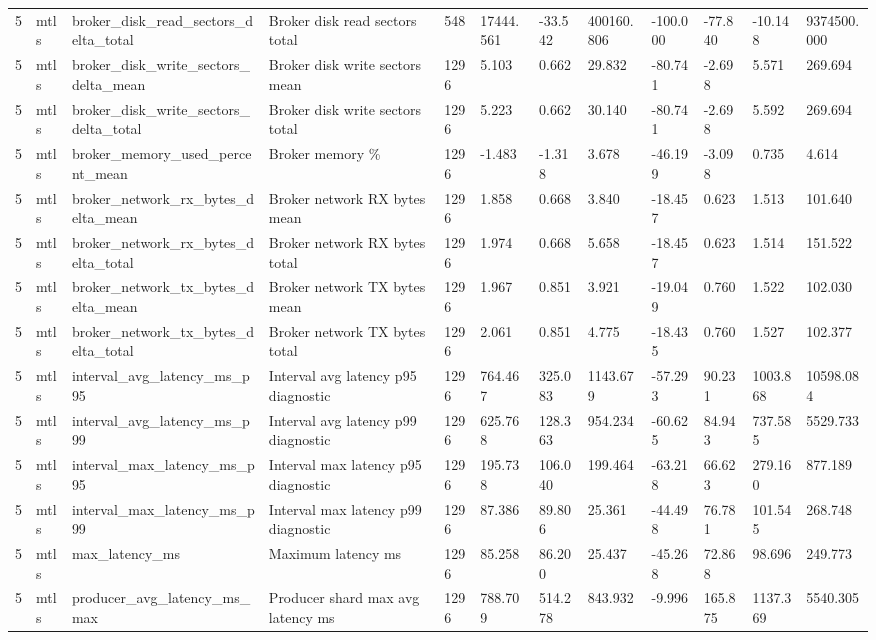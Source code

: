 \begin{longtable}{llllllllllll}
5 & mtls & broker\_disk\_read\_sectors\_delta\_total & Broker disk read sectors total & 548 & 17444.561 & -33.542 & 400160.806 & -100.000 & -77.840 & -10.148 & 9374500.000 \\
5 & mtls & broker\_disk\_write\_sectors\_delta\_mean & Broker disk write sectors mean & 1296 & 5.103 & 0.662 & 29.832 & -80.741 & -2.698 & 5.571 & 269.694 \\
5 & mtls & broker\_disk\_write\_sectors\_delta\_total & Broker disk write sectors total & 1296 & 5.223 & 0.662 & 30.140 & -80.741 & -2.698 & 5.592 & 269.694 \\
5 & mtls & broker\_memory\_used\_percent\_mean & Broker memory \% & 1296 & -1.483 & -1.318 & 3.678 & -46.199 & -3.098 & 0.735 & 4.614 \\
5 & mtls & broker\_network\_rx\_bytes\_delta\_mean & Broker network RX bytes mean & 1296 & 1.858 & 0.668 & 3.840 & -18.457 & 0.623 & 1.513 & 101.640 \\
5 & mtls & broker\_network\_rx\_bytes\_delta\_total & Broker network RX bytes total & 1296 & 1.974 & 0.668 & 5.658 & -18.457 & 0.623 & 1.514 & 151.522 \\
5 & mtls & broker\_network\_tx\_bytes\_delta\_mean & Broker network TX bytes mean & 1296 & 1.967 & 0.851 & 3.921 & -19.049 & 0.760 & 1.522 & 102.030 \\
5 & mtls & broker\_network\_tx\_bytes\_delta\_total & Broker network TX bytes total & 1296 & 2.061 & 0.851 & 4.775 & -18.435 & 0.760 & 1.527 & 102.377 \\
5 & mtls & interval\_avg\_latency\_ms\_p95 & Interval avg latency p95 diagnostic & 1296 & 764.467 & 325.083 & 1143.679 & -57.293 & 90.231 & 1003.868 & 10598.084 \\
5 & mtls & interval\_avg\_latency\_ms\_p99 & Interval avg latency p99 diagnostic & 1296 & 625.768 & 128.363 & 954.234 & -60.625 & 84.943 & 737.585 & 5529.733 \\
5 & mtls & interval\_max\_latency\_ms\_p95 & Interval max latency p95 diagnostic & 1296 & 195.738 & 106.040 & 199.464 & -63.218 & 66.623 & 279.160 & 877.189 \\
5 & mtls & interval\_max\_latency\_ms\_p99 & Interval max latency p99 diagnostic & 1296 & 87.386 & 89.806 & 25.361 & -44.498 & 76.781 & 101.545 & 268.748 \\
5 & mtls & max\_latency\_ms & Maximum latency ms & 1296 & 85.258 & 86.200 & 25.437 & -45.268 & 72.868 & 98.696 & 249.773 \\
5 & mtls & producer\_avg\_latency\_ms\_max & Producer shard max avg latency ms & 1296 & 788.709 & 514.278 & 843.932 & -9.996 & 165.875 & 1137.369 & 5540.305 \\

\end{longtable}
